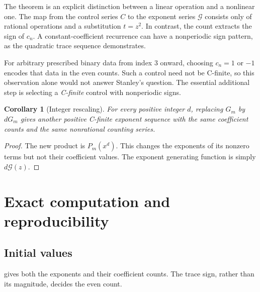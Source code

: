 \documentclass[11pt]{article}
\newtheorem{corollary}[theorem]{Corollary}
\theoremstyle{definition}\newtheorem{definition}[theorem]{Definition}
\theoremstyle{remark}\newtheorem{remark}[theorem]{Remark}
\newcommand{\GF}{\mathcal G}
\begin{document}
The theorem is an explicit distinction between a linear operation and a nonlinear one. The map from the control series $C$ to the exponent series $\GF$ consists only of rational operations and a substitution $t=z^2$. In contrast, the count extracts the sign of $c_n$. A constant-coefficient recurrence can have a nonperiodic sign pattern, as the quadratic trace sequence demonstrates.

For arbitrary prescribed binary data from index $3$ onward, choosing $c_n=1$ or $-1$ encodes that data in the even counts. Such a control need not be C-finite, so this observation alone would not answer Stanley's question. The essential additional step is selecting a \emph{C-finite} control with nonperiodic signs.

\begin{corollary}[Integer rescaling]\label{cor:scaling}
For every positive integer $d$, replacing $G_m$ by $dG_m$ gives another positive C-finite exponent sequence with the same coefficient counts and the same nonrational counting series.
\end{corollary}
\begin{proof}
The new product is $P_m(x^d)$. This changes the exponents of its nonzero terms but not their coefficient values. The exponent generating function is simply $d\GF(z)$.
\end{proof}

\section{Exact computation and reproducibility}

\subsection{Initial values}

 gives both the exponents and their coefficient counts. The trace sign, rather than its magnitude, decides the even count.
\end{document}
